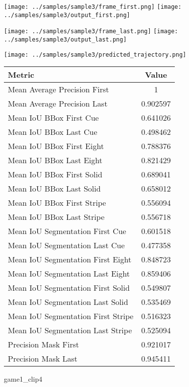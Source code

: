 \begin{figure}
\texttt{[image: ../samples/sample3/frame\_first.png]}
\texttt{[image: ../samples/sample3/output\_first.png]}\par
\texttt{[image: ../samples/sample3/frame\_last.png]}
\texttt{[image: ../samples/sample3/output\_last.png]}\par
\centering
\texttt{[image: ../samples/sample3/predicted\_trajectory.png]}
\caption{game1\_clip4}
\vspace{10pt}
\begin{tabular}{|l|c|}
\hline
\textbf{Metric} & \textbf{Value} \\
\hline
Mean Average Precision First & 1 \\
Mean Average Precision Last & 0.902597 \\
\hline
Mean IoU BBox First Cue & 0.641026 \\
Mean IoU BBox Last Cue & 0.498462 \\
Mean IoU BBox First Eight & 0.788376 \\
Mean IoU BBox Last Eight & 0.821429 \\
Mean IoU BBox First Solid & 0.689041 \\
Mean IoU BBox Last Solid & 0.658012 \\
Mean IoU BBox First Stripe & 0.556094 \\
Mean IoU BBox Last Stripe & 0.556718 \\
\hline
Mean IoU Segmentation First Cue & 0.601518 \\
Mean IoU Segmentation Last Cue & 0.477358 \\
Mean IoU Segmentation First Eight & 0.848723 \\
Mean IoU Segmentation Last Eight & 0.859406 \\
Mean IoU Segmentation First Solid & 0.549807 \\
Mean IoU Segmentation Last Solid & 0.535469 \\
Mean IoU Segmentation First Stripe & 0.516323 \\
Mean IoU Segmentation Last Stripe & 0.525094 \\
\hline
Precision Mask First & 0.921017 \\
Precision Mask Last & 0.945411 \\
\hline
\end{tabular}
\end{figure}


